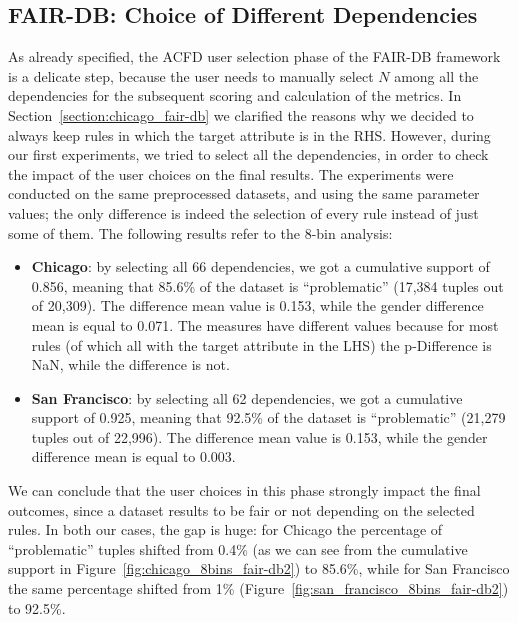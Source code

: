 \subsection{FAIR-DB: Choice of Different Dependencies}
\label{section:fair-db_choice_different_dependencies}
As already specified, the ACFD user selection phase of the FAIR-DB framework is a delicate step, because the user needs to manually select \(N\) among all the dependencies for the subsequent scoring and calculation of the metrics. In Section~\ref{section:chicago_fair-db} we clarified the reasons why we decided to always keep rules in which the target attribute is in the RHS. However, during our first experiments, we tried to select all the dependencies, in order to check the impact of the user choices on the final results. The experiments were conducted on the same preprocessed datasets, and using the same parameter values; the only difference is indeed the selection of every rule instead of just some of them. The following results refer to the 8-bin analysis:
\begin{itemize}
\item \textbf{Chicago}: by selecting all 66 dependencies, we got a cumulative support of 0.856, meaning that 85.6\% of the dataset is ``problematic'' (17,384 tuples out of 20,309). The difference mean value is 0.153, while the gender difference mean is equal to 0.071. The measures have different values because for most rules (of which all with the target attribute in the LHS) the p-Difference is NaN, while the difference is not.
\item \textbf{San Francisco}: by selecting all 62 dependencies, we got a cumulative support of 0.925, meaning that 92.5\% of the dataset is ``problematic'' (21,279 tuples out of 22,996). The difference mean value is 0.153, while the gender difference mean is equal to 0.003.
\end{itemize}
We can conclude that the user choices in this phase strongly impact the final outcomes, since a dataset results to be fair or not depending on the selected rules. In both our cases, the gap is huge: for Chicago the percentage of ``problematic'' tuples shifted from 0.4\% (as we can see from the cumulative support in Figure~\ref{fig:chicago_8bins_fair-db2}) to 85.6\%, while for San Francisco the same percentage shifted from 1\% (Figure~\ref{fig:san_francisco_8bins_fair-db2}) to 92.5\%.


